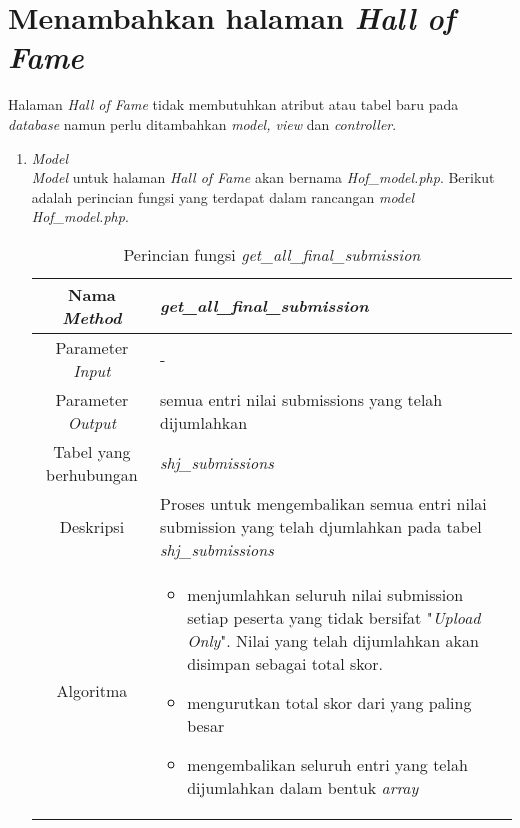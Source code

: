 \section{Menambahkan halaman \textit{Hall of Fame}}
Halaman \textit{Hall of Fame} tidak membutuhkan atribut atau tabel baru pada \textit{database} namun perlu ditambahkan \textit{model, view} dan \textit{controller}.

\begin{enumerate}
	\item \textit{Model} \\
	\textit{Model} untuk halaman \textit{Hall of Fame} akan bernama \textit{Hof\_model.php}. Berikut adalah perincian fungsi yang terdapat dalam rancangan \textit{model Hof\_model.php}.
	\begin{table}[H]
		\caption{Perincian fungsi \textit{get\_all\_final\_submission}}
		\begin{tabular}{|c|p{11cm}|}
			\hline
			Nama \textit{Method} 	& 	\textit{get\_all\_final\_submission} 	\\
			\hline
			Parameter \textit{Input} & - \\
			\hline
			Parameter \textit{Output} & semua entri nilai submissions yang telah dijumlahkan \\
			\hline
			Tabel yang berhubungan & \textit{shj\_submissions} \\
			\hline
			Deskripsi	& Proses untuk mengembalikan semua entri nilai submission yang telah djumlahkan pada tabel \textit{shj\_submissions} \\
			\hline
			Algoritma	& \begin{itemize}
				\item menjumlahkan seluruh nilai submission setiap peserta yang tidak bersifat "\textit{Upload Only}". Nilai yang telah dijumlahkan akan disimpan sebagai total skor.
				\item mengurutkan total skor dari yang paling besar
				\item mengembalikan seluruh entri yang telah dijumlahkan dalam bentuk \textit{array}
			\end{itemize} \\
			\hline
		\end{tabular}
	\end{table}
	

\end{enumerate}
